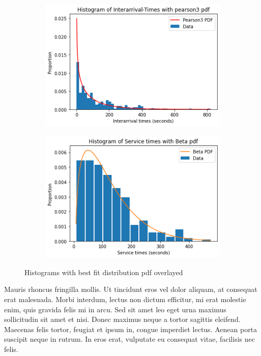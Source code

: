 \documentclass{article}
\begin{document}
\begin{figure}[h]
    \centering
    \begin{subfigure}[b]{0.45\textwidth}
        \centering
        \includegraphics[width=\textwidth]{fig3.png}
        \caption{}
        \label{fig:img3}
    \end{subfigure}
    \hfill
    \begin{subfigure}[b]{0.45\textwidth}
        \centering
        \includegraphics[width=\textwidth]{fig4.png}
        \caption{}
        \label{fig:img4}
    \end{subfigure}

    \caption{Histograms with best fit distribution pdf overlayed}
    \label{fig:two-figs2}
\end{figure}

Mauris rhoncus fringilla mollis. Ut tincidunt eros vel dolor aliquam, at consequat erat malesuada. Morbi interdum, lectus non dictum efficitur, mi erat molestie enim, quis gravida felis mi in arcu. Sed sit amet leo eget urna maximus sollicitudin sit amet et nisi. Donec maximus neque a tortor sagittis eleifend. Maecenas felis tortor, feugiat et ipsum in, congue imperdiet lectus. Aenean porta suscipit neque in rutrum. In eros erat, vulputate eu consequat vitae, facilisis nec felis.
\end{document}
